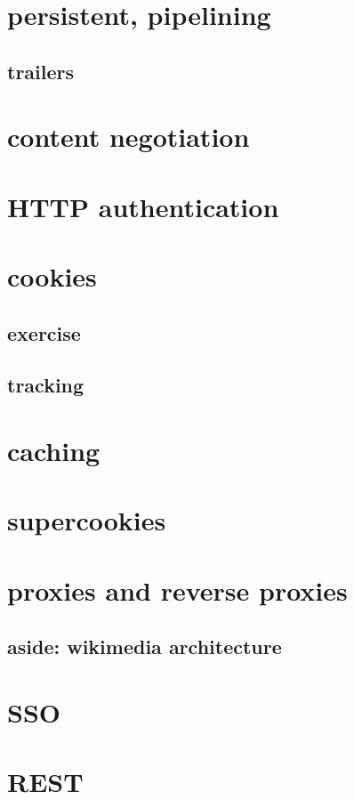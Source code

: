 \section{persistent, pipelining}


\subsection{trailers}


\section{content negotiation}


\section{HTTP authentication}

\section{cookies}


\subsection{exercise}


\subsection{tracking}


\section{caching}


\section{supercookies}


\section{proxies and reverse proxies}


\subsection{aside: wikimedia architecture}


\section{SSO}


\section{REST}


